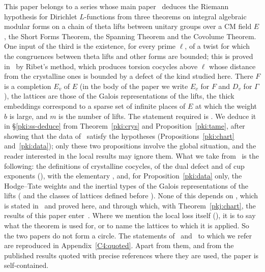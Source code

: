 \documentclass[10pt]{amsart}
\theoremstyle{definition}
\theoremstyle{remark}
\begin{document}
This paper belongs to a series whose main paper~\cite{P46} deduces the Riemann hypothesis for
Dirichlet $L$-functions from three theorems on integral algebraic modular forms on a chain of
theta lifts between unitary groups over a CM field $E$, the Short Forms Theorem, the Spanning
Theorem and the Covolume Theorem. One input of the third is the existence, for every prime
$\ell$, of a twist for which the congruences between theta lifts and other forms are bounded;
this is proved in~\cite{P55} by Ribet's method, which produces torsion cocycles above $\ell$
whose distance from the crystalline ones is bounded by a defect of the kind studied here. There
$F$ is a completion $E_v$ of $E$ (in the body of the paper we write $E_v$ for $F$ and $D_v$ for
$\Gamma$), the lattices are those of the Galois representations of the lifts,
the thick embeddings correspond to a sparse set of infinite places of $E$ at which the weight
$b$ is large, and $m$ is the number of lifts. The statement required is
{\cite[Theorem~5.8]{P55}}. We deduce it in \S\ref{pki:ss-deduce} from Theorem~\ref{pki:crys} and
Proposition~\ref{pki:tame}, after showing that the data of~\cite{P46} satisfy the hypotheses
(Propositions~\ref{pki:chart} and~\ref{pki:data}); only these two propositions involve the
global situation, and the reader interested in the local results may ignore them. What we take
from~\cite{P55} is the following: the definitions of crystalline cocycles, of the dual defect and
of cup exponents ({\cite[Definition~5.1]{P55}}), with the elementary {\cite[Lemma~5.6]{P55}}, and, for
Proposition~\ref{pki:data} only, the Hodge--Tate weights and the inertial types of the Galois
representations of the lifts ({\cite[Definition~2.6]{P55}} and the classes of lattices defined before {\cite[Proposition~5.2]{P55}}). None of this depends on {\cite[Theorem~5.8]{P55}}, which is stated in~\cite{P55} and proved here, and through which, with Theorem~\ref{pkj:chart}, the
results of this paper enter~\cite{P55}. Where we mention the local loss itself ({\cite[Propositions~2.28, 4.5 and~5.2]{P55}}), it is to say what the theorem is used for, or to name the lattices to which it is applied. So the two papers do not form a circle. The
statements of~\cite{P46} and~\cite{P55} to which we refer are reproduced in
Appendix~\ref{C4:quoted}. Apart from them, and from the published results quoted with precise
references where they are used, the paper is self-contained.
\end{document}

